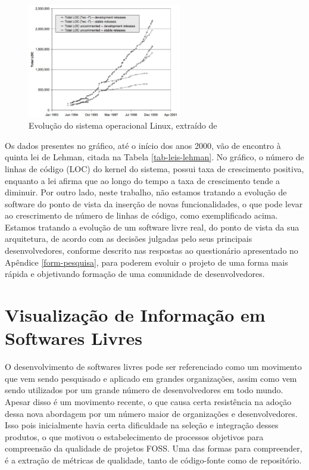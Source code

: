 \graphicspath{{figuras/}}
\begin{figure}[H]
\centering
\includegraphics[width=0.6\textwidth]{linux-evolution}
\caption{Evolução do sistema operacional Linux, extraído de \cite{godfrey2000evolution}}
\label{fig-evolucaolinux}
\end{figure}

Os dados presentes no gráfico, até o início dos anos 2000, vão de encontro à quinta lei de Lehman, citada na Tabela \ref{tab-leis-lehman}. No gráfico, o número de linhas de código (LOC) do kernel do sistema, possui taxa de crescimento positiva, enquanto a lei afirma que ao longo do tempo a taxa de crescimento tende a diminuir.
%
Por outro lado, neste trabalho, não estamos tratando a evolução de software do ponto de vista da inserção de novas funcionalidades, o que pode levar ao crescrimento de número de linhas de código, como exemplificado acima. Estamos tratando a evolução de um software livre real, do ponto de vista da sua arquitetura, de acordo com as decisões julgadas pelo seus principais desenvolvedores, conforme descrito nas respostas ao questionário apresentado no Apêndice \ref{form-pesquisa}, para poderem evoluir o projeto de uma forma mais rápida e objetivando formação de uma comunidade de desenvolvedores.

\section{Visualização de Informação em Softwares Livres}


O desenvolvimento de softwares livres pode ser referenciado como um movimento que vem sendo pesquisado e aplicado em grandes organizações, assim como vem sendo utilizados por um grande número de desenvolvedores em todo mundo. Apesar disso é um movimento recente, o que causa certa resistência na adoção dessa nova abordagem por um número maior de organizações e desenvolvedores. Isso pois inicialmente havia certa dificuldade na seleção e integração desses produtos, o que motivou o estabelecimento de processos objetivos para compreensão da qualidade de projetos FOSS. Uma das formas para compreender, é a extração de métricas de qualidade, tanto de código-fonte como de repositório. 

